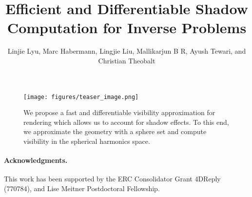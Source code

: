 \documentclass[10pt,twocolumn,letterpaper]{article}
\begin{document}
\title{Efficient and Differentiable Shadow Computation for Inverse Problems}


\author{Linjie Lyu, Marc Habermann, Lingjie Liu, Mallikarjun B R,  Ayush Tewari, and Christian Theobalt}



\maketitle


\begin{abstract}

\end{abstract}


\begin{figure}
	\centering
	\texttt{[image: figures/teaser\_image.png]} 
	\caption
	{
	    We propose a fast and differentiable visibility approximation for rendering which allows us to account for shadow effects.
	    To this end, we approximate the geometry with a sphere set and compute visibility in the spherical harmonics space.
	}
	\label{fig:teaser}
\end{figure}








\paragraph{Acknowledgments.}
%
This work has been supported by the ERC Consolidator Grant 4DReply (770784), and Lise Meitner Postdoctoral Fellowship.
%

{\small


}
\end{document}
